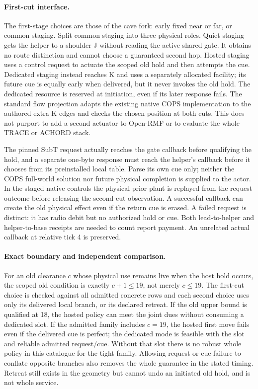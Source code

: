 \documentclass[11pt]{article}
\begin{document}
\paragraph{First-cut interface.}
The first-stage choices are those of the cave fork: early fixed
near or far, or common staging. Split common staging into three
physical roles. Quiet staging gets the helper to a shoulder J
without reading the active shared gate. It obtains no route
distinction and cannot choose a guaranteed second hop. Hosted
staging uses a control request to actuate the scoped old hold and
then attempts the cue. Dedicated staging instead reaches K and
uses a separately allocated facility; its future cue is equally
early when delivered, but it never invokes the old hold. The
dedicated resource is reserved at initiation, even if its later
response fails. The standard flow projection adapts the existing
native COPS implementation to the authored extra K edges and
checks the chosen position at both cuts. This does not purport
to add a second actuator to Open-RMF or to evaluate the whole
TRACE or ACHORD stack.

The pinned SubT request actually reaches the gate callback before
qualifying the hold, and a separate one-byte response must reach
the helper's callback before it chooses from its preinstalled
local table. Parse its own cue only; neither the COPS full-world
solution nor future physical completion is supplied to the actor.
In the staged native controls the physical prior plant is replayed
from the request outcome before releasing the second-cut observation.
A successful callback can create the old physical effect even if
the return cue is erased. A failed request is distinct: it has
radio debit but no authorized hold or cue. Both lead-to-helper and
helper-to-base receipts are needed to count report payment.
An unrelated actual callback at relative tick 4 is preserved.

\paragraph{Exact boundary and independent comparison.}
For an old clearance $c$ whose physical use remains live when the
host hold occurs, the scoped old condition is exactly $c+1\leq19$,
not merely $c\leq19$. The first-cut choice is checked against all
admitted concrete rows and each second choice uses only its
delivered local branch, or its declared retreat. If the old upper
bound is qualified at 18, the hosted policy can meet the joint dues
without consuming a dedicated slot. If the admitted family includes
$c=19$, the hosted first move fails even if the delivered cue is
perfect; the dedicated mode is feasible with the slot and reliable
admitted request/cue. Without that slot there is no robust whole
policy in this catalogue for the tight family. Allowing request or
cue failure to conflate opposite branches also removes the whole
guarantee in the stated timing. Retreat still exists in the geometry
but cannot undo an initiated old hold, and is not whole service.
\end{document}
